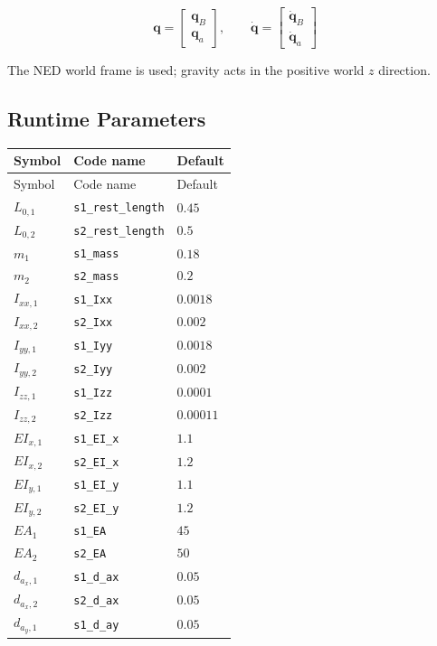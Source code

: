 \documentclass[11pt]{article}
\begin{document}
\begin{equation}
\boldsymbol q=\begin{bmatrix}\boldsymbol q_B\\\boldsymbol q_a\end{bmatrix},\qquad \dot{\boldsymbol q}=\begin{bmatrix}\dot{\boldsymbol q}_B\\\dot{\boldsymbol q}_a\end{bmatrix}
\end{equation}

The NED world frame is used; gravity acts in the positive world $z$ direction.
\subsection{Runtime Parameters}
\begin{longtable}{lll}
\hline
Symbol & Code name & Default \\
\hline
\endfirsthead
\hline Symbol & Code name & Default \\
\hline
\endhead
$L_{0,1}$ & \texttt{s1\_rest\_length} & $0.45$ \\
$L_{0,2}$ & \texttt{s2\_rest\_length} & $0.5$ \\
$m_{1}$ & \texttt{s1\_mass} & $0.18$ \\
$m_{2}$ & \texttt{s2\_mass} & $0.2$ \\
$I_{xx,1}$ & \texttt{s1\_Ixx} & $0.0018$ \\
$I_{xx,2}$ & \texttt{s2\_Ixx} & $0.002$ \\
$I_{yy,1}$ & \texttt{s1\_Iyy} & $0.0018$ \\
$I_{yy,2}$ & \texttt{s2\_Iyy} & $0.002$ \\
$I_{zz,1}$ & \texttt{s1\_Izz} & $0.0001$ \\
$I_{zz,2}$ & \texttt{s2\_Izz} & $0.00011$ \\
$EI_{x,1}$ & \texttt{s1\_EI\_x} & $1.1$ \\
$EI_{x,2}$ & \texttt{s2\_EI\_x} & $1.2$ \\
$EI_{y,1}$ & \texttt{s1\_EI\_y} & $1.1$ \\
$EI_{y,2}$ & \texttt{s2\_EI\_y} & $1.2$ \\
$EA_{1}$ & \texttt{s1\_EA} & $45$ \\
$EA_{2}$ & \texttt{s2\_EA} & $50$ \\
$d_{a_x,1}$ & \texttt{s1\_d\_ax} & $0.05$ \\
$d_{a_x,2}$ & \texttt{s2\_d\_ax} & $0.05$ \\
$d_{a_y,1}$ & \texttt{s1\_d\_ay} & $0.05$ \\

\end{longtable}
\end{document}
